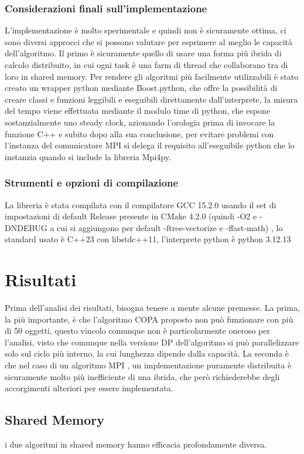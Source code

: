 \documentclass[11pt]{article}
\begin{document}
\subsubsection{Considerazioni finali sull'implementazione}
L'implementazione è molto sperimentale e quindi non è sicuramente ottima, ci sono diversi approcci che si possono valutare per esprimere al meglio le capacità dell'algoritmo. Il primo è sicuramente quello di usare una forma più ibrida di calcolo distribuito, in cui ogni task è una farm di thread che collaborano tra di loro in shared memory. Per rendere gli algoritmi più facilmente utilizzabili è stato creato un wrapper python mediante Boost.python, che offre la possibilità di creare classi e funzioni leggibili e eseguibili direttamente dall'interprete, la misura del tempo viene effettuata mediante il modulo time di python, che espone sostanzialmente uno steady clock, azionando l'orologia prima di invocare la funzione C++ e subito dopo alla sua conclusione, per evitare problemi con l'instanza del comunicatore MPI si delega il requisito all'eseguibile python che lo instanzia quando si include la libreria Mpi4py.

\subsubsection{Strumenti e opzioni di compilazione}
La libreria è stata compilata con il compilatore GCC 15.2.0 usando il set di impostazioni di default Release presente in CMake 4.2.0 (quindi -O2 e -DNDEBUG a cui si aggiungono per default -ftree-vectorize e -ffast-math) , lo standard usato è C++23 con libstdc++11, l'interprete python è python 3.12.13

\section{Risultati}
Prima dell'analisi dei risultati, bisogna tenere a mente alcune premesse. La prima, la più importante, è che l'algoritmo COPA proposto non può funzionare con più di 50 oggetti, questo vincolo comunque non è particolarmente oneroso per l'analisi, visto che comunque nella versione DP dell'algoritmo si può parallelizzare solo sul ciclo più interno, la cui lunghezza dipende dalla capacità. La seconda è che nel caso di un algoritmo MPI , un implementazione puramente distribuita è sicuramente molto più inefficiente di una ibrida, che però richiederebbe degli accorgimenti ulteriori per essere implementata.

\subsection{Shared Memory}
i due algoritmi in shared memory hanno efficacia profondamente diversa.
\end{document}
